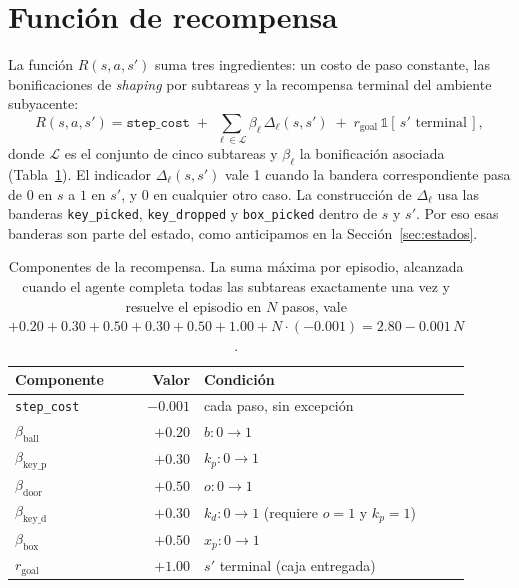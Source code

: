\documentclass[11pt,a4paper]{article}
\begin{document}
\section{Función de recompensa}
\label{sec:recompensa}

La función \(R(s, a, s')\) suma tres ingredientes: un costo de paso
constante, las bonificaciones de \emph{shaping} por subtareas y la
recompensa terminal del ambiente subyacente:
\begin{equation}
  R(s, a, s') = \texttt{step\_cost} \;+\; \sum_{\ell\in\mathcal{L}} \beta_\ell\, \Delta_\ell(s, s') \;+\; r_{\text{goal}}\,\mathbb{1}\!\left[\,s' \text{ terminal}\,\right],
  \label{eq:reward}
\end{equation}
donde \(\mathcal{L}\) es el conjunto de cinco subtareas y \(\beta_\ell\) la
bonificación asociada (Tabla~\ref{tab:rewards}). El indicador
\(\Delta_\ell(s, s')\) vale 1 cuando la bandera correspondiente pasa de
\(0\) en \(s\) a \(1\) en \(s'\), y \(0\) en cualquier otro caso. La
construcción de \(\Delta_\ell\) usa las banderas \texttt{key\_picked},
\texttt{key\_dropped} y \texttt{box\_picked} dentro de \(s\) y \(s'\). Por
eso esas banderas son parte del estado, como anticipamos en la
Sección~\ref{sec:estados}.

\begin{table}[h]
  \centering
  \small
  \setlength{\extrarowheight}{2pt}
  \begin{tabular}{l r l}
    \toprule
    \textbf{Componente} & \textbf{Valor} & \textbf{Condición} \\
    \midrule
    \texttt{step\_cost}        & \(-0.001\) & cada paso, sin excepción \\
    \(\beta_{\text{ball}}\)    & \(+0.20\)  & \(b: 0\to 1\) \\
    \(\beta_{\text{key\_p}}\)  & \(+0.30\)  & \(k_p: 0\to 1\) \\
    \(\beta_{\text{door}}\)    & \(+0.50\)  & \(o: 0\to 1\) \\
    \(\beta_{\text{key\_d}}\)  & \(+0.30\)  & \(k_d: 0\to 1\) (requiere \(o=1\) y \(k_p=1\)) \\
    \(\beta_{\text{box}}\)     & \(+0.50\)  & \(x_p: 0\to 1\) \\
    \(r_{\text{goal}}\)        & \(+1.00\)  & \(s'\) terminal (caja entregada) \\
    \bottomrule
  \end{tabular}
  \caption{Componentes de la recompensa. La suma máxima por episodio,
  alcanzada cuando el agente completa todas las subtareas exactamente una
  vez y resuelve el episodio en \(N\) pasos, vale
  \(+0.20 + 0.30 + 0.50 + 0.30 + 0.50 + 1.00 + N\cdot(-0.001) = 2.80 - 0.001\,N\).}
  \label{tab:rewards}
\end{table}
\end{document}
